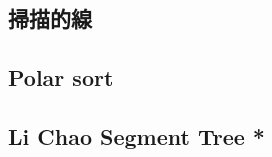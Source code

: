 \documentclass[a4paper,10pt,twocolumn,oneside]{article}
\begin{document}
\subsection{掃描的線}


\subsection{Polar sort}


% 

% 

% 

%

% 

\subsection{Li Chao Segment Tree *}


% 
\end{document}
